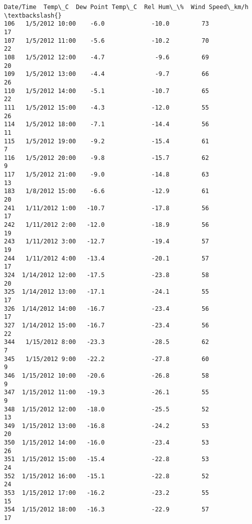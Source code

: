 \documentclass[11pt]{article}
\makeatletter
\newcommand{\boxspacing}{\kern\kvtcb@left@rule\kern\kvtcb@boxsep}
\newcommand{\prompt}[4]{
        {\ttfamily\llap{{\color{#2}[#3]:\hspace{3pt}#4}}\vspace{-\baselineskip}}
    }
\makeatother
\begin{document}
            \begin{tcolorbox}[breakable, size=fbox, boxrule=.5pt, pad at break*=1mm, opacityfill=0]
\prompt{Out}{outcolor}{96}{\boxspacing}
\begin{Verbatim}[commandchars=\\\{\}]
           Date/Time  Temp\_C  Dew Point Temp\_C  Rel Hum\_\%  Wind Speed\_km/h  \textbackslash{}
106   1/5/2012 10:00    -6.0             -10.0         73               17
107   1/5/2012 11:00    -5.6             -10.2         70               22
108   1/5/2012 12:00    -4.7              -9.6         69               20
109   1/5/2012 13:00    -4.4              -9.7         66               26
110   1/5/2012 14:00    -5.1             -10.7         65               22
111   1/5/2012 15:00    -4.3             -12.0         55               26
114   1/5/2012 18:00    -7.1             -14.4         56               11
115   1/5/2012 19:00    -9.2             -15.4         61                7
116   1/5/2012 20:00    -9.8             -15.7         62                9
117   1/5/2012 21:00    -9.0             -14.8         63               13
183   1/8/2012 15:00    -6.6             -12.9         61               20
241   1/11/2012 1:00   -10.7             -17.8         56               17
242   1/11/2012 2:00   -12.0             -18.9         56               19
243   1/11/2012 3:00   -12.7             -19.4         57               19
244   1/11/2012 4:00   -13.4             -20.1         57               17
324  1/14/2012 12:00   -17.5             -23.8         58               20
325  1/14/2012 13:00   -17.1             -24.1         55               17
326  1/14/2012 14:00   -16.7             -23.4         56               17
327  1/14/2012 15:00   -16.7             -23.4         56               22
344   1/15/2012 8:00   -23.3             -28.5         62                7
345   1/15/2012 9:00   -22.2             -27.8         60                9
346  1/15/2012 10:00   -20.6             -26.8         58                9
347  1/15/2012 11:00   -19.3             -26.1         55                9
348  1/15/2012 12:00   -18.0             -25.5         52               13
349  1/15/2012 13:00   -16.8             -24.2         53               20
350  1/15/2012 14:00   -16.0             -23.4         53               26
351  1/15/2012 15:00   -15.4             -22.8         53               24
352  1/15/2012 16:00   -15.1             -22.8         52               24
353  1/15/2012 17:00   -16.2             -23.2         55               15
354  1/15/2012 18:00   -16.3             -22.9         57               17

\end{Verbatim}
\end{tcolorbox}
\end{document}
